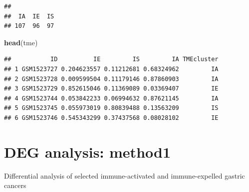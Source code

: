 \documentclass[
  12pt,
]{book}
\newenvironment{Shaded}{\begin{snugshade}}{\end{snugshade}}
\newcommand{\AttributeTok}[1]{\textcolor[rgb]{0.13,0.29,0.53}{#1}}
\newcommand{\ConstantTok}[1]{\textcolor[rgb]{0.56,0.35,0.01}{#1}}
\newcommand{\FloatTok}[1]{\textcolor[rgb]{0.00,0.00,0.81}{#1}}
\newcommand{\FunctionTok}[1]{\textcolor[rgb]{0.13,0.29,0.53}{\textbf{#1}}}
\newcommand{\NormalTok}[1]{#1}
\newcommand{\OtherTok}[1]{\textcolor[rgb]{0.56,0.35,0.01}{#1}}
\newcommand{\SpecialCharTok}[1]{\textcolor[rgb]{0.81,0.36,0.00}{\textbf{#1}}}
\newcommand{\StringTok}[1]{\textcolor[rgb]{0.31,0.60,0.02}{#1}}
\begin{document}
\begin{verbatim}
## 
##  IA  IE  IS 
## 107  96  97
\end{verbatim}

\begin{Shaded}
\begin{Highlighting}[]
\FunctionTok{head}\NormalTok{(tme)}
\end{Highlighting}
\end{Shaded}

\begin{verbatim}
##           ID          IE         IS         IA TMEcluster
## 1 GSM1523727 0.204623557 0.11212681 0.68324962         IA
## 2 GSM1523728 0.009599504 0.11179146 0.87860903         IA
## 3 GSM1523729 0.852615046 0.11369089 0.03369407         IE
## 4 GSM1523744 0.053842233 0.06994632 0.87621145         IA
## 5 GSM1523745 0.055973019 0.80839488 0.13563209         IS
## 6 GSM1523746 0.545343299 0.37437568 0.08028102         IE
\end{verbatim}

\hypertarget{deg-analysis-method1}{%
\section{DEG analysis: method1}\label{deg-analysis-method1}}

Differential analysis of selected immune-activated and immune-expelled gastric cancers

\begin{Shaded}
\end{Shaded}
\end{document}
